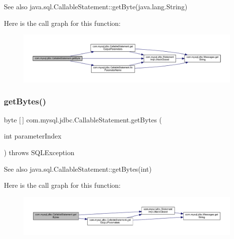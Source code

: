 \begin{DoxySeeAlso}{See also}
java.\+sql.\+Callable\+Statement\+::get\+Byte(java.\+lang.\+String) 
\end{DoxySeeAlso}
Here is the call graph for this function\+:\nopagebreak
\begin{figure}[H]
\begin{center}
\leavevmode
\includegraphics[width=350pt]{classcom_1_1mysql_1_1jdbc_1_1_callable_statement_aea67d241da9e8e7001ac6312ff079ae2_cgraph}
\end{center}
\end{figure}
\mbox{\label{classcom_1_1mysql_1_1jdbc_1_1_callable_statement_a8283d495de6954580d193c053fbfcb11}} 
\subsubsection{\texorpdfstring{get\+Bytes()}{getBytes()}\hspace{0.1cm}{\footnotesize\ttfamily [1/2]}}
{\footnotesize\ttfamily byte \mbox{[}$\,$\mbox{]} com.\+mysql.\+jdbc.\+Callable\+Statement.\+get\+Bytes (\begin{DoxyParamCaption}\item[{int}]{parameter\+Index }\end{DoxyParamCaption}) throws S\+Q\+L\+Exception}

\begin{DoxySeeAlso}{See also}
java.\+sql.\+Callable\+Statement\+::get\+Bytes(int) 
\end{DoxySeeAlso}
Here is the call graph for this function\+:\nopagebreak
\begin{figure}[H]
\begin{center}
\leavevmode
\includegraphics[width=350pt]{classcom_1_1mysql_1_1jdbc_1_1_callable_statement_a8283d495de6954580d193c053fbfcb11_cgraph}
\end{center}
\end{figure}
\mbox{\label{classcom_1_1mysql_1_1jdbc_1_1_callable_statement_aaee5dbe4c81955ef3696f2b99b41f24b}} 

